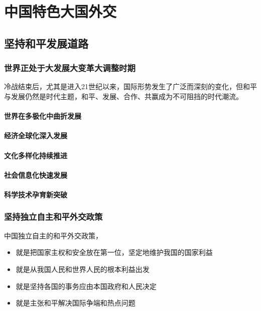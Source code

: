\chapter{中国特色大国外交}

\section{坚持和平发展道路}
    \subsection{世界正处于大发展大变革大调整时期}
        冷战结束后，尤其是进入21世纪以来，国际形势发生了广泛而深刻的变化，但和平与发展仍然是时代主题，和平、发展、合作、共赢成为不可阻挡的时代潮流。

        \subsubsection{世界在多极化中曲折发展}
        \subsubsection{经济全球化深入发展}
        \subsubsection{文化多样化持续推进}
        \subsubsection{社会信息化快速发展}
        \subsubsection{科学技术孕育新突破}

    \subsection{坚持独立自主和平外交政策}
        中国独立自主的和平外交政策，
        \begin{itemize}
            \item 就是把国家主权和安全放在第一位，坚定地维护我国的国家利益
            \item 就是从我国人民和世界人民的根本利益出发
            \item 就是坚持各国的事务应由本国政府和人民决定
            \item 就是主张和平解决国际争端和热点问题
        \end{itemize}

